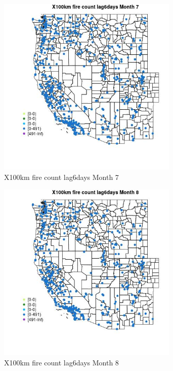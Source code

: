 \begin{figure} 
\centering  
\includegraphics[width=0.77\textwidth]{Code_Outputs/Report_ML_input_PM25_Step4_part_e_de_duplicated_aves_compiled_2019-05-14wNAs_MapObsMo7X100km_fire_count_lag6days.jpg} 
\caption{\label{fig:Report_ML_input_PM25_Step4_part_e_de_duplicated_aves_compiled_2019-05-14wNAsMapObsMo7X100km_fire_count_lag6days}X100km fire count lag6days Month 7} 
\end{figure} 
 

\begin{figure} 
\centering  
\includegraphics[width=0.77\textwidth]{Code_Outputs/Report_ML_input_PM25_Step4_part_e_de_duplicated_aves_compiled_2019-05-14wNAs_MapObsMo8X100km_fire_count_lag6days.jpg} 
\caption{\label{fig:Report_ML_input_PM25_Step4_part_e_de_duplicated_aves_compiled_2019-05-14wNAsMapObsMo8X100km_fire_count_lag6days}X100km fire count lag6days Month 8} 
\end{figure} 
 

